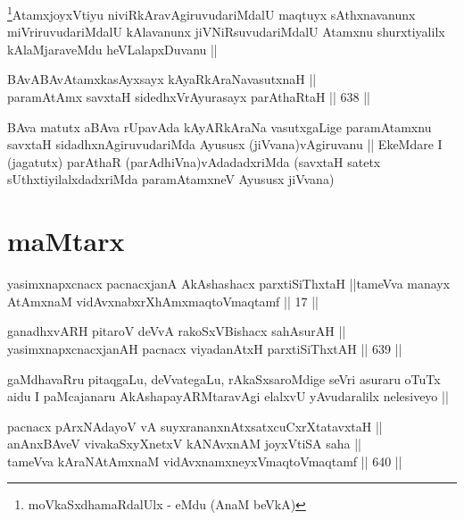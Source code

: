\begin{artha}
\footnote{\stext moVkaSxdhamaRdalUlx - \stext eMdu (AnaM beVkA)}AtamxjoyxVtiyu niviRkAravAgiruvudariMdalU maqtuyx
sAthxnavanunx miVriruvudariMdalU kAlavanunx jiVNiRsuvudariMdalU
Atamxnu shurxtiyalilx kAlaMjaraveMdu heVLalapxDuvanu ||
\end{artha}


\begin{shl}
BAvABAvAtamxkasAyxsayx kAyaRkAraNavasutxnaH || \\
paramAtAmx savxtaH sidedhxVrAyurasayx parAthaRtaH ||  638 ||  
\end{shl}

\begin{artha}
BAva matutx aBAva rUpavAda kAyARkAraNa vasutxgaLige paramAtamxnu
savxtaH sidadhxnAgiruvudariMda Ayususx (jiVvana)vAgiruvanu || EkeMdare
I (jagatutx) parAthaR (parAdhiVna)vAdadadxriMda (savxtaH satetx
sUthxtiyilalxdadxriMda paramAtamxneV Ayususx jiVvana) 
\end{artha}

\section*{maMtarx}

\begin{shl}
yasimxnapxcnacx pacnacxjanA AkAshashacx parxtiSiThxtaH ||tameVva manayx AtAmxnaM vidAvxnabxrXhAmxmaqtoV\s maqtamf || 17 ||
\end{shl}


\begin{shl}
ganadhxvARH pitaroV deVvA rakoSxVBishacx sahAsurAH || \\
yasimxnapxcnacxjanAH pacnacx viyadanAtxH parxtiSiThxtAH ||  639 ||  
\end{shl}

\begin{artha}
gaMdhavaRru pitaqgaLu, deVvategaLu, rAkaSxsaroMdige seVri asuraru
oTuTx aidu I paMcajanaru AkAshapayARMtaravAgi elalxvU yAvudaralilx
nelesiveyo ||
\end{artha}

\begin{shl}
pacnacx pArxNAdayoV vA suyxrananxnAtxsatxcuCxrXtatavxtaH || \\
anAnxBAveV vivakaSxyXnetxV kANAvxnAM joyxVtiSA saha || \\
tameVva kAraNAtAmxnaM vidAvxnamxneyxV\s maqtoV\s maqtamf ||  640 ||  
\end{shl}

